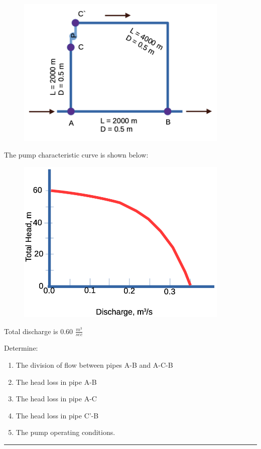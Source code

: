 \documentclass[12pt]{article}
\begin{document}
\begin{enumerate}
\begin{figure}[h!] %
   \centering
   \includegraphics[width=4in]{network-layout.png} 
   \caption{}
   \label{fig:network-layout}
\end{figure}

The pump characteristic curve is shown below:

\begin{figure}[h!] %
   \centering
   \includegraphics[width=4in]{pump-curve-ex4.png} 
   \caption{}
   \label{fig:pump-curve-ex4}
\end{figure}

Total discharge is 0.60 $\frac{m^3}{sec}$ 

Determine:
\begin{enumerate}
\item The division of flow between pipes A-B and A-C-B
\item The head loss in pipe A-B
\item The head loss in pipe A-C
\item The head loss in pipe C'-B
\item The pump operating conditions.
\end{enumerate}

\noindent\rule{\linewidth}{0.4pt}
\clearpage
\end{enumerate}
\end{document}
